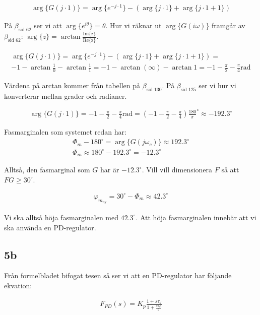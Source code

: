 \documentclass[a4paper]{article}
\newcommand{\mhb}[1]{$\beta_{\text{#1}}$}     %
\begin{document}
\begin{align*}
  \arg\{G(j\cdot 1)\} = \arg\{e^{-j\cdot 1}\} - (\arg\{j\cdot 1\} + \arg\{j\cdot 1 + 1\})
\end{align*}

På \mhb{sid 62} ser vi att $\arg\{e^{i\theta}\} = \theta$. Hur vi räknar ut $\arg\{ G(i\omega) \}$ framgår av \mhb{sid 62}: $\arg\{z\} = \arctan{\frac{\text{Im\{z\}}}{\text{Re\{z\}}}}$.

\begin{align*}
  \arg\{G(j\cdot 1)\} = \arg\{e^{-j\cdot 1}\} - (\arg\{j\cdot 1\} + \arg\{j\cdot 1 + 1\}) = \\
  -1 - \arctan\frac{1}{0} - \arctan\frac{1}{1} = -1 -\arctan ( \infty ) - \arctan 1 = -1 -\frac{\pi}{2} -\frac{\pi}{4} \text{rad}
\end{align*}

Värdena på arctan kommer från tabellen på \mhb{sid 130}. På \mhb{sid 125} ser vi hur vi konverterar mellan grader och radianer.

\begin{align*}
  \arg\{G(j\cdot 1)\} = -1 -\frac{\pi}{2} -\frac{\pi}{4} \text{rad} = (-1 -\frac{\pi}{2} -\frac{\pi}{4})\frac{180}{\pi}^\circ \approx -192.3^\circ
\end{align*}

Fasmarginalen som systemet redan har:
\begin{align*}
  \Phi_m - 180^\circ = \arg\{G(j\omega_c)\} \approx 192.3^\circ\\
  \Phi_m \approx 180^\circ - 192.3^\circ = -12.3^\circ
\end{align*}

Alltså, den fasmarginal som $G$ har är $-12.3^\circ$. Vill vill dimensionera $F$ så att $FG \geq 30^\circ$.

\begin{align*}
  \varphi_{m_{\text{ny}}} = 30^\circ - \Phi_m \approx 42.3^\circ
\end{align*}

Vi ska alltså höja fasmarginalen med $42.3^\circ$. Att höja fasmarginalen innebär att vi ska använda en PD-regulator.


\subsection{5b}
Från formelbladet bifogat tesen så ser vi att en PD-regulator har följande ekvation:

\begin{align*}
  F_{PD}(s) = K_p \frac{1+s\tau_d}{1+\frac{s\tau_d}{b}}
\end{align*}
\end{document}
